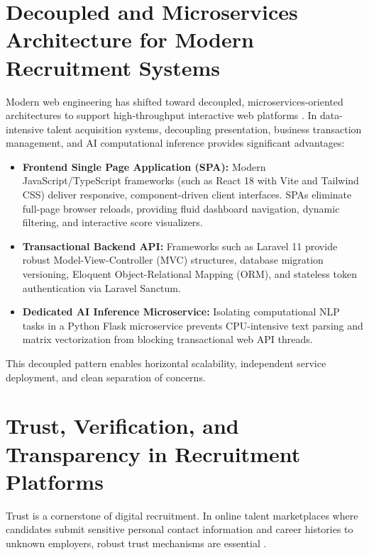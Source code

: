 \section{Decoupled and Microservices Architecture for Modern Recruitment Systems}
Modern web engineering has shifted toward decoupled, microservices-oriented architectures to support high-throughput interactive web platforms \cite{fielding2000rest}. In data-intensive talent acquisition systems, decoupling presentation, business transaction management, and AI computational inference provides significant advantages:

\begin{itemize}
    \item \textbf{Frontend Single Page Application (SPA):} Modern JavaScript/TypeScript frameworks (such as React 18 with Vite and Tailwind CSS) deliver responsive, component-driven client interfaces. SPAs eliminate full-page browser reloads, providing fluid dashboard navigation, dynamic filtering, and interactive score visualizers.
    \item \textbf{Transactional Backend API:} Frameworks such as Laravel 11 provide robust Model-View-Controller (MVC) structures, database migration versioning, Eloquent Object-Relational Mapping (ORM), and stateless token authentication via Laravel Sanctum.
    \item \textbf{Dedicated AI Inference Microservice:} Isolating computational NLP tasks in a Python Flask microservice prevents CPU-intensive text parsing and matrix vectorization from blocking transactional web API threads.
\end{itemize}

This decoupled pattern enables horizontal scalability, independent service deployment, and clean separation of concerns.

\section{Trust, Verification, and Transparency in Recruitment Platforms}
Trust is a cornerstone of digital recruitment. In online talent marketplaces where candidates submit sensitive personal contact information and career histories to unknown employers, robust trust mechanisms are essential \cite{kessler2021hiring}.

